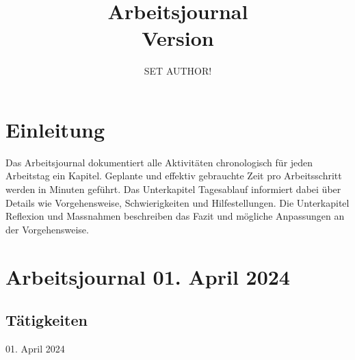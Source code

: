 


\makeglossaries





\title{Arbeitsjournal\\
	\small{Version \vhCurrentVersion}}
\author{SET AUTHOR!}
\date{\vhCurrentDate}



	\maketitle
	
	\tableofcontents
	\newpage
	
	\section{Einleitung}
	Das Arbeitsjournal dokumentiert alle Aktivitäten chronologisch für jeden Arbeitstag ein Kapitel. Geplante und effektiv gebrauchte Zeit pro Arbeitsschritt werden in Minuten geführt. Das Unterkapitel Tagesablauf informiert dabei über Details wie Vorgehensweise, Schwierigkeiten und Hilfestellungen. Die Unterkapitel Reflexion und Massnahmen beschreiben das Fazit und mögliche Anpassungen an der Vorgehensweise.
	
	\section{Arbeitsjournal 01. April 2024}
	
	\subsection{Tätigkeiten}
	
	\begin{timetable}{01. April 2024}
	\end{timetable}

